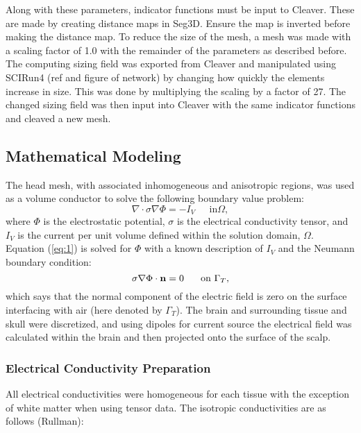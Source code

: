  Along with these parameters, indicator functions must be input to Cleaver. These are made by creating distance maps in Seg3D. Ensure the map is inverted before making the distance map. To reduce the size of the mesh, a mesh was made with a scaling factor of 1.0 with the remainder of the parameters as described before. The computing sizing field was exported from Cleaver and manipulated using SCIRun4 (ref and figure of network) by changing how quickly the elements increase in size. This was done by multiplying the scaling by a factor of 27. The changed sizing field was then input into Cleaver with the same indicator functions and cleaved a new mesh.

\subsection{Mathematical Modeling}
\label{sec:math}


The head mesh, with associated inhomogeneous and anisotropic regions, was used as a volume conductor to solve the following boundary value problem:
%
\begin{equation}
\label{eq:1} \nabla\cdot\sigma\nabla\Phi = -I_{V} \;\;\;\;\mbox{ in
}\Omega,
\end{equation} 
%
where $\Phi$ is the electrostatic potential, $\sigma$ is the electrical conductivity tensor, and $I_{V}$ is the current per unit volume defined within the solution domain, $\Omega$. Equation (\ref{eq:1}) is solved for $\Phi$ with a known description of $I_{V}$ and the Neumann boundary condition:
%
\begin{equation} \sigma\nabla\Phi\cdot{\bf
n} = 0\;\;\;\;\;\mbox{ on }\Gamma_{T}, 
\end{equation} 
%
which says that the normal component of the electric field is zero on the surface interfacing with air (here denoted by $\Gamma_{T}$). The brain and surrounding tissue and skull were discretized, and using dipoles for current source the electrical field was calculated within the brain and then projected onto the surface of the scalp.

\subsubsection{Electrical Conductivity Preparation} 

All electrical conductivities were homogeneous for each tissue with the exception of white matter when using tensor data. The isotropic conductivities are as follows (Rullman): 

